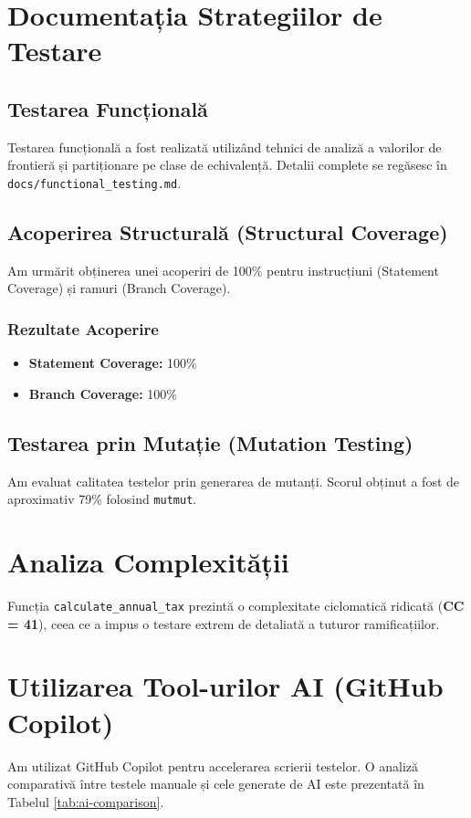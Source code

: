 \documentclass[12pt,a4paper]{article}
\begin{document}
\section{Documentația Strategiilor de Testare}

\subsection{Testarea Funcțională}
Testarea funcțională a fost realizată utilizând tehnici de analiză a valorilor de frontieră și partiționare pe clase de echivalență. Detalii complete se regăsesc în \texttt{docs/functional\_testing.md}.

\subsection{Acoperirea Structurală (Structural Coverage)}
Am urmărit obținerea unei acoperiri de 100\% pentru instrucțiuni (Statement Coverage) și ramuri (Branch Coverage).

\subsubsection{Rezultate Acoperire}
\begin{itemize}
    \item \textbf{Statement Coverage:} 100\%
    \item \textbf{Branch Coverage:} 100\%
\end{itemize}

\subsection{Testarea prin Mutație (Mutation Testing)}
Am evaluat calitatea testelor prin generarea de mutanți. Scorul obținut a fost de aproximativ 79\% folosind \texttt{mutmut}.

\section{Analiza Complexității}
Funcția \texttt{calculate\_annual\_tax} prezintă o complexitate ciclomatică ridicată (\textbf{CC = 41}), ceea ce a impus o testare extrem de detaliată a tuturor ramificațiilor.

\section{Utilizarea Tool-urilor AI (GitHub Copilot)}
Am utilizat GitHub Copilot pentru accelerarea scrierii testelor. O analiză comparativă între testele manuale și cele generate de AI este prezentată în Tabelul \ref{tab:ai-comparison}.
\end{document}

